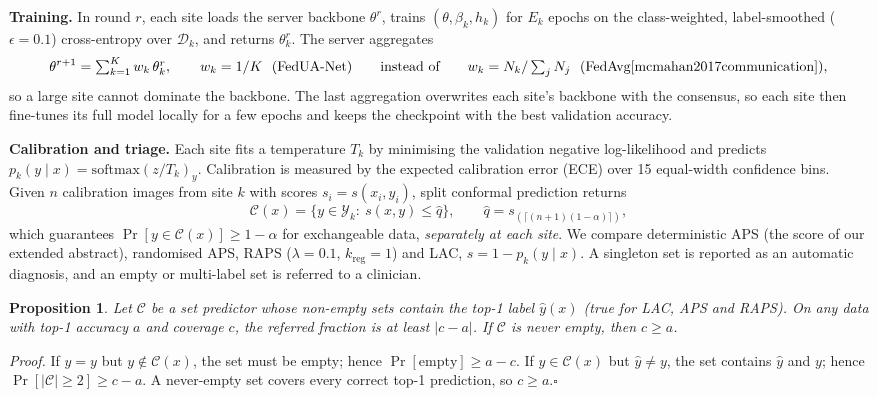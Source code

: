 \documentclass[]{spie}
\newtheorem{proposition}{Proposition}
\begin{document}
\textbf{Training.} In round $r$, each site loads the server backbone $\theta^r$, trains $(\theta,\beta_k,h_k)$ for $E_k$ epochs on the class-weighted, label-smoothed ($\epsilon{=}0.1$) cross-entropy over $\mathcal{D}_k$, and returns $\theta^r_k$. The server aggregates
\begin{equation}
\theta^{r+1}=\textstyle\sum_{k=1}^{K}w_k\,\theta_k^{r},\qquad w_k=1/K\ \ \text{(FedUA-Net)}\qquad\text{instead of}\qquad w_k=N_k/\textstyle\sum_j N_j\ \ \text{(FedAvg\cite{mcmahan2017communication})},
\label{eq:agg}
\end{equation}
so a large site cannot dominate the backbone. The last aggregation overwrites each site's backbone with the consensus, so each site then fine-tunes its full model locally for a few epochs and keeps the checkpoint with the best validation accuracy.

\textbf{Calibration and triage.} Each site fits a temperature $T_k$ by minimising the validation negative log-likelihood and predicts $p_k(y\mid x)=\mathrm{softmax}(z/T_k)_y$\cite{guo2017calibration}. Calibration is measured by the expected calibration error (ECE) over 15 equal-width confidence bins. Given $n$ calibration images from site $k$ with scores $s_i=s(x_i,y_i)$, split conformal prediction\cite{angelopoulos2023gentle} returns
\begin{equation}
\mathcal{C}(x)=\{y\in\mathcal{Y}_k:\ s(x,y)\le\hat q\},\qquad \hat q=s_{(\lceil(n+1)(1-\alpha)\rceil)},
\label{eq:cp}
\end{equation}
which guarantees $\Pr[y\in\mathcal{C}(x)]\ge1-\alpha$ for exchangeable data, \emph{separately at each site}. We compare deterministic APS (the score of our extended abstract), randomised APS\cite{romano2020aps}, RAPS\cite{angelopoulos2021raps} ($\lambda{=}0.1$, $k_{\mathrm{reg}}{=}1$) and LAC, \mbox{$s=1-p_k(y\mid x)$}\cite{sadinle2019least}. A singleton set is reported as an automatic diagnosis, and an empty or multi-label set is referred to a clinician.

\begin{proposition}\label{prop:referral}
Let $\mathcal{C}$ be a set predictor whose non-empty sets contain the top-1 label $\hat y(x)$ (true for LAC, APS and RAPS). On any data with top-1 accuracy $a$ and coverage $c$, the referred fraction is at least $|c-a|$. If $\mathcal{C}$ is never empty, then $c\ge a$.
\end{proposition}
\noindent\emph{Proof.} If $\hat y=y$ but $y\notin\mathcal{C}(x)$, the set must be empty; hence $\Pr[\text{empty}]\ge a-c$. If $y\in\mathcal{C}(x)$ but $\hat y\neq y$, the set contains $\hat y$ and $y$; hence $\Pr[|\mathcal{C}|\ge2]\ge c-a$. A never-empty set covers every correct top-1 prediction, so $c\ge a$.\hfill$\square$
\end{document}
